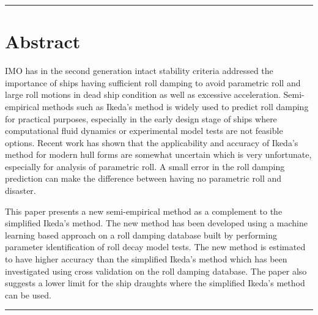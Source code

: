 {\footnotesize
\noindent\rule{\columnwidth}{0.4pt}
\section*{Abstract}\label{se:abstract}
IMO has in the second generation intact stability criteria addressed the importance of ships having sufficient roll damping to avoid parametric roll and large roll motions in dead ship condition as well as excessive acceleration. 
Semi-empirical methods such as Ikeda’s method is widely used to predict roll damping for practical purposes, especially in the early design stage of ships where computational fluid dynamics or experimental model tests are not feasible options. Recent work has shown that the applicability and accuracy of Ikeda’s method for modern hull forms are somewhat uncertain which is very unfortunate, especially for analysis of parametric roll. A small error in the roll damping prediction can make the difference between having no parametric roll and disaster.

This paper presents a new semi-empirical method as a complement to the simplified Ikeda's method. The new method has been developed using a machine learning based approach on a roll damping database built by performing parameter identification of roll decay model tests. 
The new method is estimated to have higher accuracy than the simplified Ikeda's method which has been investigated using cross validation on the roll damping database. The paper also suggests a lower limit for the ship draughts where the simplified Ikeda's method can be used.


}
\newline
\noindent\rule{\columnwidth}{0.4pt}